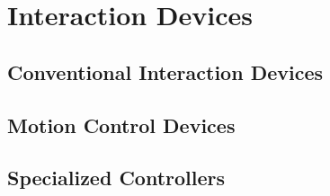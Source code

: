 \chapter{Interaction Devices}
\section{Conventional Interaction Devices}
\section{Motion Control Devices}
\section{Specialized Controllers}
